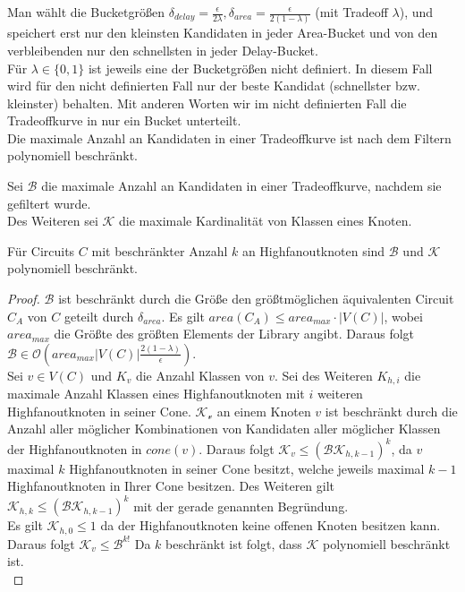 \documentclass[11pt, a4paper, german]{article}
\begin{document}
Man wählt die Bucketgrößen $\delta_{delay} = \frac{\epsilon}{2\lambda}, \delta_{area} = \frac{\epsilon}{2(1-\lambda)}$ (mit Tradeoff $\lambda$), und speichert erst nur den kleinsten Kandidaten in jeder Area-Bucket und von den verbleibenden nur den schnellsten in jeder Delay-Bucket.\\
Für $\lambda \in \{ 0,1 \}$ ist jeweils eine der Bucketgrößen nicht definiert. In diesem Fall wird für den nicht definierten Fall nur der beste Kandidat (schnellster bzw. kleinster) behalten. Mit anderen Worten wir im nicht definierten Fall die Tradeoffkurve in nur ein Bucket unterteilt.\\
Die maximale Anzahl an Kandidaten in einer Tradeoffkurve ist nach dem Filtern polynomiell beschränkt. 
\begin{definition}
Sei $\mathcal{B}$ die maximale Anzahl an Kandidaten in einer Tradeoffkurve, nachdem sie gefiltert wurde.\\
Des Weiteren sei $\mathcal{K}$ die maximale Kardinalität von Klassen eines Knoten.
\end{definition}
\begin{cor}
Für Circuits $C$ mit beschränkter Anzahl $k$ an Highfanoutknoten sind $\mathcal{B}$ und $\mathcal{K}$ polynomiell beschränkt.
\end{cor}
\begin{proof}
$\mathcal{B}$ ist beschränkt durch die Größe den größtmöglichen äquivalenten Circuit $C_A$ von $C$ geteilt durch $\delta_{area}$. Es gilt $area(C_A )\leq area_{max}\cdot |V(C)|$, wobei $area_{max}$ die Größte des größten Elements der Library angibt. Daraus folgt $\mathcal{B} \in \mathcal{O}(area_{max} |V(C)|\frac{2(1-\lambda)}{\epsilon})$. \\
Sei $v \in V(C)$ und $K_v$ die Anzahl Klassen von $v$. Sei des Weiteren $K_{h,i}$ die maximale Anzahl Klassen eines Highfanoutknoten mit $i$ weiteren Highfanoutknoten in seiner Cone. 
$\mathcal{K_v}$ an einem Knoten $v$ ist beschränkt durch die Anzahl aller möglicher Kombinationen von Kandidaten aller möglicher Klassen der Highfanoutknoten in $cone(v)$. Daraus folgt $\mathcal{K}_v \leq (\mathcal{BK}_{h,k-1})^k$, da $v$ maximal $k$ Highfanoutknoten in seiner Cone besitzt, welche jeweils maximal $k-1$ Highfanoutknoten in Ihrer Cone besitzen. Des Weiteren gilt $\mathcal{K}_{h,k} \leq (\mathcal{BK}_{h,k-1})^k$ mit der gerade genannten Begründung.\\
Es gilt $\mathcal{K}_{h,0} \leq 1$ da der Highfanoutknoten keine offenen Knoten besitzen kann. \\
Daraus folgt $\mathcal{K}_v \leq \mathcal{B}^{k!}$ Da $k$ beschränkt ist folgt, dass $\mathcal{K}$ polynomiell beschränkt ist.\\
\end{proof}
\end{document}
